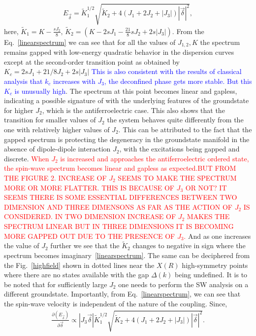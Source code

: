 \begin{eqnarray}
\label{linearspectrum}
E_{\vec{\delta}}=\tilde{K}_1^{1/2}\sqrt{\tilde{K}_2 + 4(J_1 + 2J_2+|J_3|)|\vec{\delta}|^2},
\end{eqnarray}
here, $\tilde{K}_1=K-\frac{sJ_2}{8}$, $\tilde{K}_2=(K-2sJ_1-\frac{21}{8}sJ_2+2s|J_3|)$. From the Eq.~\eqref{linearspectrum} we can see that for all the values of $J_{1,2}, K$ the spectrum remains gapped with low-energy quadratic behavior in the dispersion curves except at the second-order transition point as obtained by $K_c=2sJ_1 + 21/8J_2+2s|J_3|$ \textcolor{blue}{This is also consistent with the results of classical analysis that $k_c$ increases with $J_3$, the deconfined phase gets more stable. But this $K_c$ is unusually high}. The spectrum at this point becomes linear and gapless, indicating a possible signature of with the underlying features of the groundstate for higher $J_2$, which is the antiferroelectric case. This also shows that the transition for smaller values of $J_2$ the system behaves quite differently from the one with relatively higher values of $J_2$. This can be attributed to the fact that the gapped spectrum is protecting the degeneracy in the groundstate manifold in the absence of dipole-dipole interaction $J_2$, with the excitations being gapped and discrete. \textcolor{red}{When $J_2$ is increased and approaches the antiferroelectric ordered state, the spin-wave spectrum becomes linear and gapless as expected.BUT FROM THE FIGURE 2. INCREASE OF $J_2$ SEEMS TO MAKE THE SPECTRUM MORE OR MORE FLATTER. THIS IS BECAUSE OF $J_3$ OR NOT? IT SEEMS THERE IS SOME ESSENTIAL DIFFERENCES BETWEEN TWO DIMENSION AND THREE DIMENSONS AS FAR AS THE ACTION OF $J_2$ IS CONSIDERED. IN TWO DIMENSION INCREASE OF $J_2$ MAKES THE SPECTRUM LINEAR BUT IN THREE DIMENSIONS IT IS BECOMING MORE GAPPED OUT DUE TO THE PRESENCE OF $J_3$.} And as one increases the value of $J_2$ further we see that the $\tilde{K}_2$ changes to negative in sign where the spectrum becomes imaginary~\eqref{linearspectrum}. The same can be deciphered from the Fig.~\ref{highfield} shown in dotted lines near the $X(R)$ high-symmetry points where there are no states available with the gap $\Delta(k)$ being undefined. It is to be noted that for sufficiently large $J_2$ one needs to perform the SW analysis on a different groundstate. Importantly, from Eq.~\ref{linearspectrum}, we can see that the spin-wave velocity is independent of the nature of the coupling. Since,
\begin{eqnarray}
\frac{\partial(E_{\vec{\delta}})}{\partial{\vec{\delta}}}\propto |J_3\vec{\delta}|\tilde{K}_1^{1/2}\sqrt{\tilde{K}_2 + 4(J_1 + 2J_2+|J_3|)|\vec{\delta}|^2}.
\end{eqnarray}
